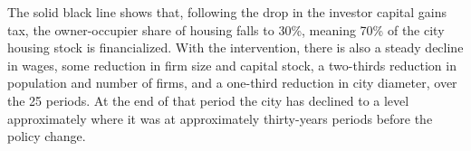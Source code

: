 The solid black line shows that, following the drop in the investor capital gains tax,  the owner-occupier share of housing falls to 30\%, meaning 70\% of the city housing stock is financialized. 
With the intervention, there is also a steady decline in wages, some reduction in firm size and capital stock, a two-thirds reduction in population and number of firms, and a one-third reduction in city diameter, over the 25 periods. At the end of that period the city has declined to a level approximately where it was at approximately thirty-years periods before the policy change. %


